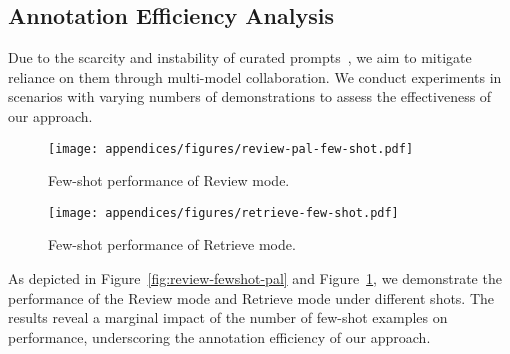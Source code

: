 \subsection{Annotation Efficiency Analysis}
\label{appendix:ann-eff}

Due to the scarcity and instability of curated prompts~\citep{ye2022the},
we aim to mitigate reliance on them through multi-model collaboration. 
We conduct experiments in scenarios with varying numbers of demonstrations to assess the effectiveness of our approach.


\begin{figure}[ht]
    \centering
    \begin{minipage}[t]{0.48\textwidth}
        \texttt{[image: appendices/figures/review-pal-few-shot.pdf]}
        \caption{Few-shot performance of Review mode.}
        \label{fig:review-fewshot-pal}
    \end{minipage}
    \hfill
    \begin{minipage}[t]{0.48\textwidth}
        \texttt{[image: appendices/figures/retrieve-few-shot.pdf]}
        \caption{Few-shot performance of Retrieve mode.}
        \label{fig:retrieve-fewshot}
    \end{minipage}
\end{figure}


As depicted in Figure~\ref{fig:review-fewshot-pal} and Figure~\ref{fig:retrieve-fewshot},
we demonstrate the performance of the Review mode and Retrieve mode under different shots.
The results reveal a marginal impact of the number of few-shot examples on performance, 
underscoring the annotation efficiency of our approach.



